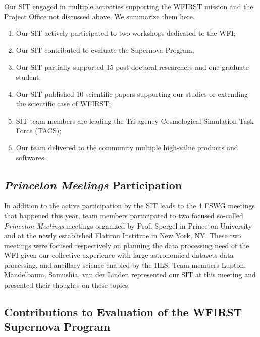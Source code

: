 

\begin{summary}
Our SIT engaged in multiple activities supporting the WFIRST mission and the Project Office not discussed above. We summarize them here.
\begin{enumerate}
\item Our SIT actively participated to two workshops dedicated to the WFI;
\item Our SIT contributed to evaluate the Supernova Program;
\item Our SIT partially supported 15 post-doctoral researchers and one graduate student;
\item Our SIT published 10 scientific papers supporting our studies or extending the scientific case of WFIRST;
\item SIT team members are leading the Tri-agency Cosmological Simulation Task Force (TACS);
\item Our team delivered to the community multiple high-value products and softwares.
\end{enumerate}
\end{summary}


\subsection{\emph{Princeton Meetings} Participation}

In addition to the active participation by the SIT leads to the 4 FSWG meetings that happened this year, team members participated to two focused so-called \emph{Princeton Meetings} meetings organized by Prof. Spergel in Princeton University and at the newly established Flatiron Institute in  New York, NY. These two meetings were focused respectively on planning the data processing need of the WFI given our collective experience with large astronomical datasets data processing, and ancillary science enabled by the HLS. Team members Lupton, Mandelbaum, Samushia, van der Linden represented our SIT at this meeting and presented their thoughts on these topics.

\subsection{Contributions to Evaluation of the WFIRST Supernova Program}

